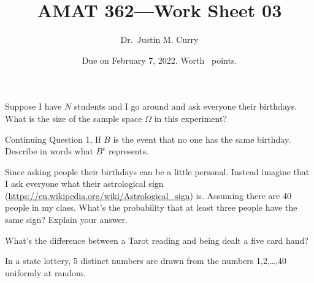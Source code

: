 \documentclass[addpoints,12pt]{exam}
\title{\vspace{-1in} AMAT 362---Work Sheet 03}
\date{Due on February 7, 2022. Worth \numpoints\ points.}
\author{Dr.~Justin M. Curry}
\begin{document}
\maketitle


\begin{questions}

\question[1] Suppose I have $N$ students and I go around and ask everyone their birthdays. What is the size of the sample space $\Omega$ in this experiment? 
\vspace{1in}

\question[1] Continuing Question 1, If $B$ is the event that no one has the same birthday. Describe in words what $B^c$ represents.
\vspace{1in}

\question[2] Since asking people their birthdays can be a little personal. Instead imagine that I ask everyone what their astrological sign (\url{https://en.wikipedia.org/wiki/Astrological_sign}) is. Assuming there are 40 people in my class. What's the probability that at least three people have the same sign? Explain your answer.
\vspace{1in}

\question[1] What's the difference between a Tarot reading and being dealt a five card hand?
\vspace{1in}

\question[3] In a state lottery, 5 distinct numbers are drawn from the numbers 1,2,\ldots,40 uniformly at random.
\noaddpoints
{}
\end{questions}
\end{document}
